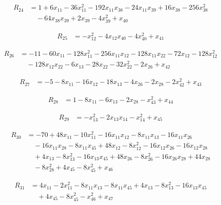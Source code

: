 \begin{align*}
R_{24} &= 1 +6 x_{11} -36 x_{11}^{2} -192 x_{11} x_{38} -24 x_{11} x_{39} +16 x_{38} -256 x_{38}^{2} \\
&\quad -64 x_{38} x_{39} +2 x_{39} -4 x_{39}^{2} +x_{40}
\end{align*}

\begin{align*}
R_{25} &= -x_{12}^{2} -4 x_{12} x_{40} -4 x_{40}^{2} +x_{41}
\end{align*}

\begin{align*}
R_{26} &= -11 -60 x_{11} -128 x_{11}^{2} -256 x_{11} x_{12} -128 x_{11} x_{22} -72 x_{12} -128 x_{12}^{2} \\
&\quad -128 x_{12} x_{22} -6 x_{13} -28 x_{22} -32 x_{22}^{2} -2 x_{26} +x_{42}
\end{align*}

\begin{align*}
R_{27} &= -5 -8 x_{11} -16 x_{12} -18 x_{13} -4 x_{26} -2 x_{28} -2 x_{42}^{2} +x_{43}
\end{align*}

\begin{align*}
R_{28} &= 1 -8 x_{11} -6 x_{13} -2 x_{28} -x_{43}^{2} +x_{44}
\end{align*}

\begin{align*}
R_{29} &= -x_{13}^{2} -2 x_{13} x_{14} -x_{14}^{2} +x_{45}
\end{align*}

\begin{align*}
R_{30} &= -70 +48 x_{11} -10 x_{11}^{2} -16 x_{11} x_{12} -8 x_{11} x_{13} -16 x_{11} x_{26} \\
&\quad -16 x_{11} x_{28} -8 x_{11} x_{45} +48 x_{12} -8 x_{12}^{2} -16 x_{12} x_{26} -16 x_{12} x_{28} \\
&\quad +4 x_{13} -8 x_{13}^{2} -16 x_{13} x_{45} +48 x_{26} -8 x_{26}^{2} -16 x_{26} x_{28} +44 x_{28} \\
&\quad -8 x_{28}^{2} +4 x_{45} -8 x_{45}^{2} +x_{46}
\end{align*}

\begin{align*}
R_{31} &= 4 x_{11} -2 x_{11}^{2} -8 x_{11} x_{13} -8 x_{11} x_{45} +4 x_{13} -8 x_{13}^{2} -16 x_{13} x_{45} \\
&\quad +4 x_{45} -8 x_{45}^{2} -x_{46}^{2} +x_{47}
\end{align*}

